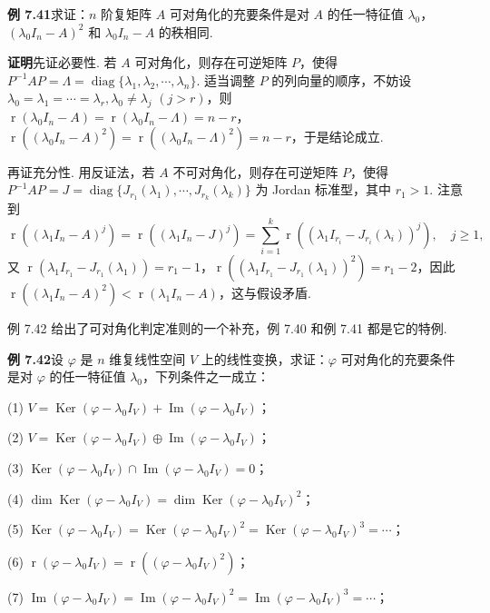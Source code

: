 \documentclass[UTF8,12pt,a4paper,fontset=fandol]{ctexart}
\begin{document}
\noindent\textbf{例 7.41}\quad 求证：$n$ 阶复矩阵 $A$ 可对角化的充要条件是对 $A$ 的任一特征值 $\lambda_0$，$(\lambda_0I_n-A)^2$ 和 $\lambda_0I_n-A$ 的秩相同.

\noindent\textbf{证明}\quad 先证必要性. 若 $A$ 可对角化，则存在可逆矩阵 $P$，使得 $P^{-1}AP=\Lambda=\operatorname{diag}\{\lambda_1,\lambda_2,\cdots,\lambda_n\}$. 适当调整 $P$ 的列向量的顺序，不妨设 $\lambda_0=\lambda_1=\cdots=\lambda_r,\lambda_0\ne\lambda_j$ $(j>r)$，则 $\operatorname{r}(\lambda_0I_n-A)=\operatorname{r}(\lambda_0I_n-\Lambda)=n-r$，$\operatorname{r}((\lambda_0I_n-A)^2)=\operatorname{r}((\lambda_0I_n-\Lambda)^2)=n-r$，于是结论成立.

再证充分性. 用反证法，若 $A$ 不可对角化，则存在可逆矩阵 $P$，使得 $P^{-1}AP=J=\operatorname{diag}\{J_{r_1}(\lambda_1),\cdots,J_{r_k}(\lambda_k)\}$ 为 Jordan 标准型，其中 $r_1>1$. 注意到
\[
\operatorname{r}((\lambda_1I_n-A)^j)=\operatorname{r}((\lambda_1I_n-J)^j)
=\sum_{i=1}^k\operatorname{r}((\lambda_1I_{r_i}-J_{r_i}(\lambda_i))^j),\quad j\ge 1,
\]
又 $\operatorname{r}(\lambda_1I_{r_1}-J_{r_1}(\lambda_1))=r_1-1$，$\operatorname{r}((\lambda_1I_{r_1}-J_{r_1}(\lambda_1))^2)=r_1-2$，因此 $\operatorname{r}((\lambda_1I_n-A)^2)<\operatorname{r}(\lambda_1I_n-A)$，这与假设矛盾.

例 7.42 给出了可对角化判定准则的一个补充，例 7.40 和例 7.41 都是它的特例.

\noindent\textbf{例 7.42}\quad 设 $\varphi$ 是 $n$ 维复线性空间 $V$ 上的线性变换，求证：$\varphi$ 可对角化的充要条件是对 $\varphi$ 的任一特征值 $\lambda_0$，下列条件之一成立：

(1) $V=\operatorname{Ker}(\varphi-\lambda_0I_V)+\operatorname{Im}(\varphi-\lambda_0I_V)$；

(2) $V=\operatorname{Ker}(\varphi-\lambda_0I_V)\oplus\operatorname{Im}(\varphi-\lambda_0I_V)$；

(3) $\operatorname{Ker}(\varphi-\lambda_0I_V)\cap\operatorname{Im}(\varphi-\lambda_0I_V)=0$；

(4) $\dim\operatorname{Ker}(\varphi-\lambda_0I_V)=\dim\operatorname{Ker}(\varphi-\lambda_0I_V)^2$；

(5) $\operatorname{Ker}(\varphi-\lambda_0I_V)=\operatorname{Ker}(\varphi-\lambda_0I_V)^2=\operatorname{Ker}(\varphi-\lambda_0I_V)^3=\cdots$；

(6) $\operatorname{r}(\varphi-\lambda_0I_V)=\operatorname{r}((\varphi-\lambda_0I_V)^2)$；

(7) $\operatorname{Im}(\varphi-\lambda_0I_V)=\operatorname{Im}(\varphi-\lambda_0I_V)^2=\operatorname{Im}(\varphi-\lambda_0I_V)^3=\cdots$；
\end{document}
